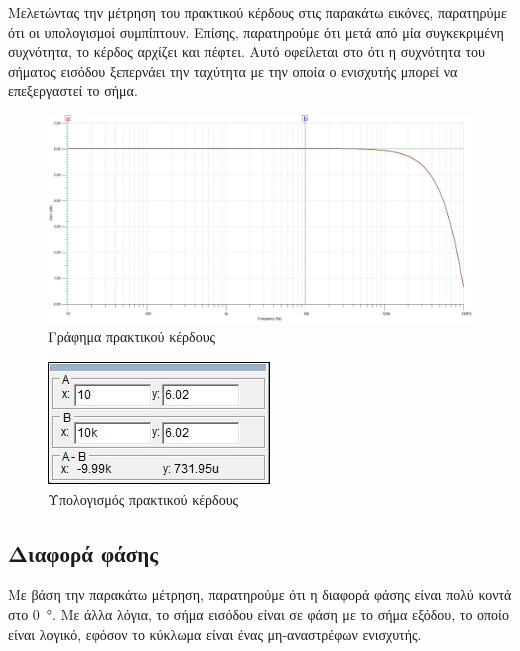 \documentclass[12pt]{article}
\begin{document}
Μελετώντας την μέτρηση του πρακτικού κέρδους στις παρακάτω εικόνες, παρατηρύμε
ότι οι υπολογισμοί συμπίπτουν. Επίσης, παρατηρούμε ότι μετά από μία
συγκεκριμένη συχνότητα, το κέρδος αρχίζει και πέφτει. Αυτό οφείλεται στο ότι η
συχνότητα του σήματος εισόδου ξεπερνάει την ταχύτητα με την οποία ο ενισχυτής
μπορεί να επεξεργαστεί το σήμα.

\begin{figure}[H]
	\centering
	\includegraphics[width=\linewidth]{./res/gain.jpg}
	\caption{Γράφημα πρακτικού κέρδους}
\end{figure}
\begin{figure}[H]
	\centering
	\includegraphics{./res/gaincalc.jpg}
	\caption{Υπολογισμός πρακτικού κέρδους}
\end{figure}

\subsection{Διαφορά φάσης}

Με βάση την παρακάτω μέτρηση, παρατηρούμε ότι η διαφορά φάσης είναι πολύ κοντά
στο \SI{0}{\degree}. Με άλλα λόγια, το σήμα εισόδου είναι σε φάση με το σήμα
εξόδου, το οποίο είναι λογικό, εφόσον το κύκλωμα είναι ένας μη-αναστρέφων
ενισχυτής.
\end{document}
